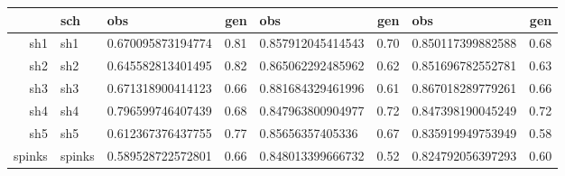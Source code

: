\begin{table}[ht]
\centering
\begin{tabular}{rllrlrlr}
  \hline
 & sch & obs & gen & obs & gen & obs & gen \\ 
  \hline
sh1 & sh1 & 0.670095873194774 & 0.81 & 0.857912045414543 & 0.70 & 0.850117399882588 & 0.68 \\ 
  sh2 & sh2 & 0.645582813401495 & 0.82 & 0.865062292485962 & 0.62 & 0.851696782552781 & 0.63 \\ 
  sh3 & sh3 & 0.671318900414123 & 0.66 & 0.881684329461996 & 0.61 & 0.867018289779261 & 0.66 \\ 
  sh4 & sh4 & 0.796599746407439 & 0.68 & 0.847963800904977 & 0.72 & 0.847398190045249 & 0.72 \\ 
  sh5 & sh5 & 0.612367376437755 & 0.77 & 0.85656357405336 & 0.67 & 0.835919949753949 & 0.58 \\ 
  spinks & spinks & 0.589528722572801 & 0.66 & 0.848013399666732 & 0.52 & 0.824792056397293 & 0.60 \\ 
   \hline
\end{tabular}
\label{comp_tab}
\end{table}
